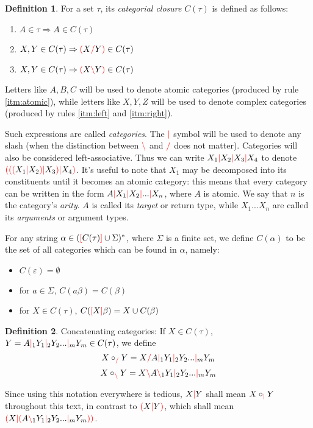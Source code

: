 \documentclass[12pt]{extarticle}
\theoremstyle{definition} \newtheorem{defn}{Definition}
\theoremstyle{definition} \newtheorem{prop}{Proposition}
\theoremstyle{definition} \newtheorem{property}{Property}
\newcommand{\lc}{\textcolor{red}{\backslash}}
\newcommand{\rc}{\textcolor{red}{/}}
\newcommand{\mc}{\textcolor{red}{|}}
\newcommand{\lb}{\textcolor{red}{[}}
\newcommand{\rb}{\textcolor{red}{]}}
\newcommand{\lp}{\textcolor{red}{(}}
\newcommand{\rp}{\textcolor{red}{)}}
\begin{document}
\begin{defn}
    For a set $\tau$, its \emph{categorial closure} $C(\tau)$ is defined as follows:
    \begin{enumerate}
        \item \label{itm:atomic} $A \in \tau \Rightarrow A \in C(\tau)$
        \item \label{itm:right}  $X, Y \in C(\tau) \Rightarrow \lp X \rc Y \rp \in C(\tau)$
        \item \label{itm:left}   $X, Y \in C(\tau) \Rightarrow \lp X \lc Y \rp \in C(\tau)$
    \end{enumerate}

    Letters like $A, B, C$ will be used to denote atomic categories (produced
    by rule \ref{itm:atomic}), while letters like $X, Y, Z$ will be used to
    denote complex categories (produced by rules \ref{itm:left} and \ref{itm:right}).

    Such expressions are called \emph{categories}. The $\mc$ symbol will be
    used to denote any slash (when the distinction between $\lc$ and $\rc$
    does not matter). Categories will also be considered left-associative.
    Thus we can write $X_1 \mc X_2 \mc X_3 \mc X_4$ to denote
    $\lp \lp \lp X_1 \mc X_2 \rp \mc X_3 \rp \mc X_4 \rp$. It's useful to note that $X_1$ may
    be decomposed into its constituents until it becomes an atomic category:
    this means that every category can be written in the form
    $A \mc X_1 \mc X_2 \mc ... \mc X_n$, where $A$ is atomic. We say that
    $n$ is the category's \emph{arity}. $A$ is called its \emph{target} or
    return type, while
    $X_1 ... X_n$ are called its \emph{arguments} or argument types.

    For any string $\alpha \in (\lb C(\tau) \rb \cup \Sigma)^*$, where $\Sigma$ is a
    finite set, we define $C(\alpha)$ to be the set of all categories which
    can be found in $\alpha$, namely:
    \begin{itemize}
        \item $C(\varepsilon) = \emptyset$
        \item for $a \in \Sigma$, $C(a\beta) = C(\beta)$
        \item for $X \in C(\tau)$, $C(\lb X \rb \beta) = X \cup C(\beta)$
    \end{itemize}
\end{defn}

\begin{defn}
    Concatenating categories: If $X \in C(\tau)$,
    $Y = A \mc_1 Y_1 \mc_2 Y_2 ... \mc_m Y_m \in C(\tau)$, we define
    \[ X \circ_{\rc} Y = X \rc A \mc_1 Y_1 \mc_2 Y_2 ... \mc_m Y_m \]
    \[ X \circ_{\lc} Y = X \lc A \lc_1 Y_1 \mc_2 Y_2 ... \mc_m Y_m \]

    Since using this notation everywhere is tedious, $X \mc Y$ shall mean
    $X \circ_{\mc} Y$ throughout this text, in contrast to
    $\lp X \mc Y \rp$, which shall mean $\lp X \mc \lp A \lc_1 Y_1 \mc_2 Y_2 ... \mc_m Y_m \rp \rp$.
\end{defn}
\end{document}
